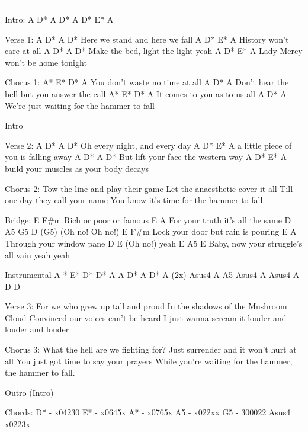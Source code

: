 \noindent\rule{\columnwidth}{1pt}

\begin{multicols}{2}
\begin{lstsong}
Intro: A D* A D* A D* E* A

Verse 1:
A       D*        A       D*
Here we stand and here we fall
A    D*         E*      A
  History won't care at all
A        D*   A         D*
Make the bed, light the light yeah
A      D*             E*     A
  Lady Mercy won't be home tonight
 
Chorus 1:
A*        E*       D*      A
You don't waste no time at all
      A                     D*         A
Don't hear the bell but you answer the call
A*          E*     D*    A
It comes to you as to us all
           A               D*        A
We're just waiting for the hammer to fall
 
Intro
 
Verse 2:
A        D*          A    D*
Oh every night, and every day
A         D*              E*      A
 a little piece of you is falling away
A             D*   A           D*
But lift your face the western way
A           D*              E*   A
 build your muscles as your body decays
 
Chorus 2:
Tow the line and play their game
Let the anaesthetic cover it all
Till one day they call your name
You know it's time for the hammer to fall
\end{lstsong}\vfill\columnbreak\begin{lstsong}
Bridge:
E               F#m
Rich or poor or famous
         E                  A
For your truth it's all the same
D   A5  G5 D    (G5)
(Oh no! Oh no!)
E                  F#m
Lock your door but rain is pouring
E                   A
Through your window pane
D   E
(Oh no!) yeah
E              A5             E
Baby, now your struggle's all vain yeah yeah

Instrumental
A *  E*  D*   D*  A   A  D*  A   D*  A  (2x)
Asus4  A  A5  Asus4  A  Asus4  A   D   D
 
Verse 3:
For we who grew up tall and proud
In the shadows of the Mushroom Cloud
Convinced our voices can't be heard
I just wanna scream it louder and louder and louder
 
Chorus 3:
What the hell are we fighting for?
Just surrender and it won't hurt at all
You just got time to say your prayers
While you're waiting for the hammer, the hammer to fall.

Outro (Intro)
\end{lstsong}
\begin{lsttab}
Chords:
D* - x04230
E* - x0645x
A* - x0765x
A5 - x022xx
G5 - 300022
Asus4 x0223x
\end{lsttab}
\end{multicols}
\newpage

